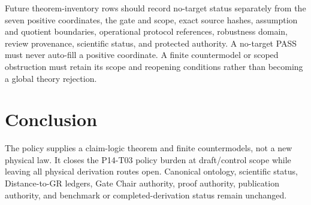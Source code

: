 \documentclass[11pt]{article}
\begin{document}
Future theorem-inventory rows should record no-target status separately from
the seven positive coordinates, the gate and scope, exact source hashes,
assumption and quotient boundaries, operational protocol references,
robustness domain, review provenance, scientific status, and protected
authority.  A no-target PASS must never auto-fill a positive coordinate.  A
finite countermodel or scoped obstruction must retain its scope and reopening
conditions rather than becoming a global theory rejection.

\section{Conclusion}

The policy supplies a claim-logic theorem and finite countermodels, not a new physical law.
It closes the P14-T03 policy burden at draft/control scope while
leaving all physical derivation routes open.  Canonical ontology, scientific
status, Distance-to-GR ledgers, Gate Chair authority, proof authority,
publication authority, and benchmark or completed-derivation status remain
unchanged.
\end{document}

